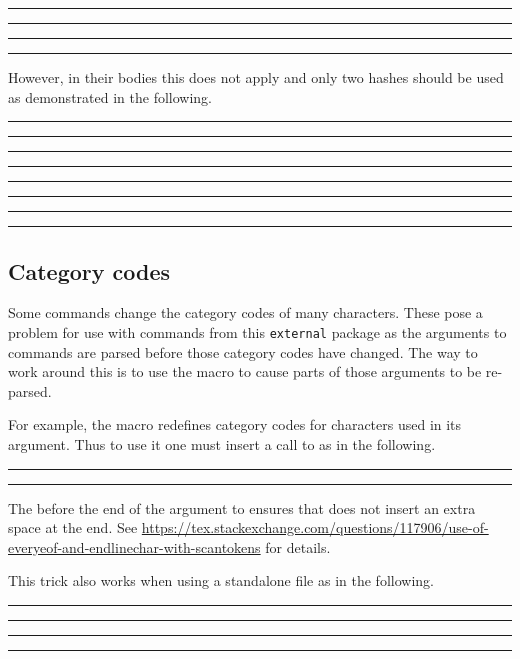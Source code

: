 \documentclass[10pt]{ltxdoc}
\newcommand{\pkg}[1]{\texttt{#1}}
\newcommand{\showfile}[1]{
  \begin{tcolorbox}[title=\texttt{#1}]
  
  \end{tcolorbox}
}
\def\gauge{%
  \rule{0.2em}{7pt}%
  \llap{\rule[8pt]{0.2em}{2pt}}%
}
\begin{document}
\begin{tcblisting}{}
\gauge
{}%
\gauge

\gauge
\begin{paren}
\end{paren}
\gauge
\end{tcblisting}

However, in their bodies this does not apply and only two hashes should be used
as demonstrated in the following.

\begin{tcblisting}{}
\gauge\newexternal{\paren}\gauge

\gauge{}\gauge
\end{tcblisting}

\begin{tcblisting}{}
\gauge{}\gauge

\gauge
{}
\gauge
\end{tcblisting}

\subsection{Category codes}
\label{subsec:Catcodes}

Some commands change the category codes of many characters.
These pose a problem for use with commands from this \pkg{external}
package as the arguments to commands are parsed before those category
codes have changed.
The way to work around this is to use the  macro to
cause parts of those arguments to be re-parsed.

For example, the  macro redefines category codes
for characters used in its argument.
Thus to use it one must insert a call to  as in the
following.

\begin{tcblisting}{}
\gauge
{}%
\gauge
\end{tcblisting}

The  before the end of the argument to 
ensures that  does not insert an extra space at the end.
See
\url{https://tex.stackexchange.com/questions/117906/use-of-everyeof-and-endlinechar-with-scantokens}
for details.

This trick also works when using a standalone file as in the following.

\showfile{example-standalone-catcode.tex}

\begin{tcblisting}{}
\gauge\ExternalCompile[file=example-standalone-catcode]\gauge

\gauge\ExternalRead[file=example-standalone-catcode]\gauge
\end{tcblisting}
\end{document}
